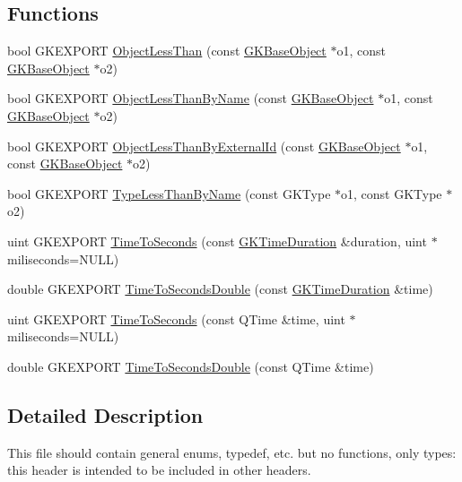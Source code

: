 \subsection*{Functions}
\begin{DoxyCompactItemize}
\item 
bool G\+K\+E\+X\+P\+O\+RT \hyperlink{namespaceGK_a9a2c928fc44cbecdbd948b4b0b489538}{Object\+Less\+Than} (const \hyperlink{classGKBaseObject}{G\+K\+Base\+Object} $\ast$o1, const \hyperlink{classGKBaseObject}{G\+K\+Base\+Object} $\ast$o2)
\item 
bool G\+K\+E\+X\+P\+O\+RT \hyperlink{namespaceGK_ad5e4e1a2c41fd8335dc543c26e8b5761}{Object\+Less\+Than\+By\+Name} (const \hyperlink{classGKBaseObject}{G\+K\+Base\+Object} $\ast$o1, const \hyperlink{classGKBaseObject}{G\+K\+Base\+Object} $\ast$o2)
\item 
bool G\+K\+E\+X\+P\+O\+RT \hyperlink{namespaceGK_a3492164edf11fdcaffb9435bce038876}{Object\+Less\+Than\+By\+External\+Id} (const \hyperlink{classGKBaseObject}{G\+K\+Base\+Object} $\ast$o1, const \hyperlink{classGKBaseObject}{G\+K\+Base\+Object} $\ast$o2)
\item 
bool G\+K\+E\+X\+P\+O\+RT \hyperlink{namespaceGK_ada52d07ebbbd8dda87d756e44a73cba8}{Type\+Less\+Than\+By\+Name} (const G\+K\+Type $\ast$o1, const G\+K\+Type $\ast$o2)
\item 
uint G\+K\+E\+X\+P\+O\+RT \hyperlink{namespaceGK_ac4e1e92b6badc3e06e92f7590be79070}{Time\+To\+Seconds} (const \hyperlink{classGKTimeDuration}{G\+K\+Time\+Duration} \&duration, uint $\ast$miliseconds=N\+U\+LL)
\item 
double G\+K\+E\+X\+P\+O\+RT \hyperlink{namespaceGK_af2bbd33c2ffce344989207ae36fa6c08}{Time\+To\+Seconds\+Double} (const \hyperlink{classGKTimeDuration}{G\+K\+Time\+Duration} \&time)
\item 
uint G\+K\+E\+X\+P\+O\+RT \hyperlink{namespaceGK_adfccbf56e5ddc541fe499357ab85e83e}{Time\+To\+Seconds} (const Q\+Time \&time, uint $\ast$miliseconds=N\+U\+LL)
\item 
double G\+K\+E\+X\+P\+O\+RT \hyperlink{namespaceGK_acf7645da975cc14ff6cb6533e43e03b7}{Time\+To\+Seconds\+Double} (const Q\+Time \&time)
\end{DoxyCompactItemize}


\subsection{Detailed Description}
This file should contain general enums, typedef, etc. but no functions, only types\+: this header is intended to be included in other headers. 

